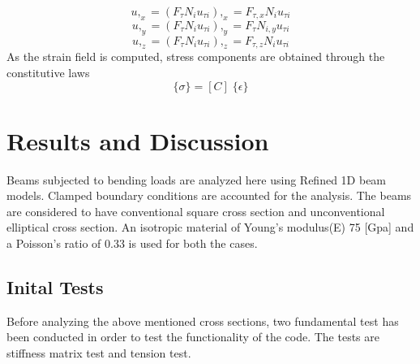 \documentclass[a4paper,12pt]{article}
\begin{document}
\begin{equation}
u,_{x} = (F_{\tau} N_{i} u_{\tau i}),_{x} = F_{\tau,x} N_{i} u_{\tau i}
\label{u,x}
\end{equation}
\begin{equation}
u,_{y} = (F_{\tau} N_{i} u_{\tau i}),_{y} = F_{\tau} N_{i,y} u_{\tau i}
\label{u,y}
\end{equation}
\begin{equation}
u,_{z} = (F_{\tau} N_{i} u_{\tau i}),_{z} = F_{\tau,z} N_{i} u_{\tau i}
\label{u,z}
\end{equation}
As the strain field is computed, stress components are obtained through the constitutive laws
\begin{equation}
\{\sigma\} = [C]\;\{\epsilon\}
\end{equation}

\section*{Results and Discussion}
\indent\indent\indent\indent Beams subjected to bending loads are analyzed here using Refined 1D beam models. Clamped boundary conditions are accounted for the analysis. The beams are considered to have conventional square cross section and unconventional elliptical cross section. An isotropic material of Young's modulus(E) 75 [Gpa] and a Poisson's ratio of 0.33 is used for both the cases.

\subsection*{Inital Tests}
\indent\indent\indent\indent Before analyzing the above mentioned cross sections, two fundamental test has been conducted in order to test the functionality of the code. The tests are stiffness matrix test and tension test.
\end{document}
